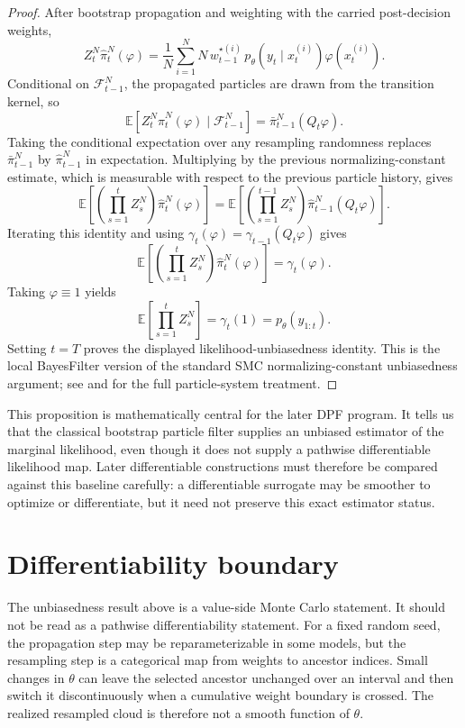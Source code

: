 \begin{proof}
After bootstrap propagation and weighting with the carried post-decision
weights,
\[
  Z_t^N \hat\pi_t^N(\varphi)
  =
  \frac{1}{N}\sum_{i=1}^N
  N\,w_{t-1}^{\star(i)}\,p_\theta(y_t\mid x_t^{(i)})\varphi(x_t^{(i)}).
\]
Conditional on $\mathcal F_{t-1}^N$, the propagated particles are drawn from
the transition kernel, so
\[
  \mathbb E\!\left[
    Z_t^N\hat\pi_t^N(\varphi)\mid \mathcal F_{t-1}^N
  \right]
  =
  \bar\pi_{t-1}^N(Q_t\varphi).
\]
Taking the conditional expectation over any resampling randomness replaces
$\bar\pi_{t-1}^N$ by $\hat\pi_{t-1}^N$ in expectation.  Multiplying by the
previous normalizing-constant estimate, which is measurable with respect to the
previous particle history, gives
\[
  \mathbb E\!\left[
    \left(\prod_{s=1}^t Z_s^N\right)\hat\pi_t^N(\varphi)
  \right]
  =
  \mathbb E\!\left[
    \left(\prod_{s=1}^{t-1} Z_s^N\right)
    \hat\pi_{t-1}^N(Q_t\varphi)
  \right].
\]
Iterating this identity and using
$\gamma_t(\varphi)=\gamma_{t-1}(Q_t\varphi)$ gives
\[
  \mathbb E\!\left[
    \left(\prod_{s=1}^t Z_s^N\right)\hat\pi_t^N(\varphi)
  \right]
  =
  \gamma_t(\varphi).
\]
Taking $\varphi\equiv 1$ yields
\[
  \mathbb{E}\left[\prod_{s=1}^t Z_s^N\right]
  =
  \gamma_t(1)
  =
  p_\theta(y_{1:t}).
\]
Setting $t=T$ proves the displayed likelihood-unbiasedness identity.  This is
the local BayesFilter version of the standard SMC normalizing-constant
unbiasedness argument; see \citet{doucet2001sequential} and
\citet{andrieu2010particle} for the full particle-system treatment.
\end{proof}

This proposition is mathematically central for the later DPF program.  It tells
us that the classical bootstrap particle filter supplies an unbiased estimator
of the marginal likelihood, even though it does not supply a pathwise differentiable
likelihood map.  Later differentiable constructions must therefore be compared
against this baseline carefully: a differentiable surrogate may be smoother to
optimize or differentiate, but it need not preserve this exact estimator
status.

\section{Differentiability boundary}
\label{sec:bf-pf-differentiability-boundary}

The unbiasedness result above is a value-side Monte Carlo statement.  It should
not be read as a pathwise differentiability statement.  For a fixed random seed,
the propagation step may be reparameterizable in some models, but the
resampling step is a categorical map from weights to ancestor indices.  Small
changes in $\theta$ can leave the selected ancestor unchanged over an interval
and then switch it discontinuously when a cumulative weight boundary is crossed.
The realized resampled cloud is therefore not a smooth function of $\theta$.

